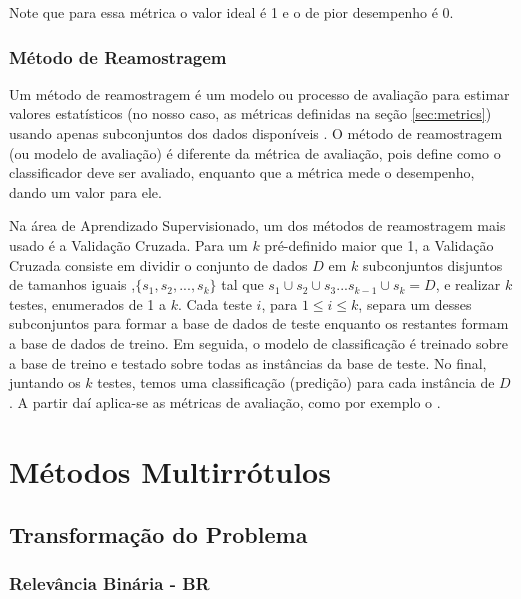 Note que para essa métrica o valor ideal é 1 e o de pior desempenho é 0.

\subsection{Método de Reamostragem}
\label{sec:modelav}

Um método de reamostragem é um modelo ou processo de avaliação para estimar valores estatísticos
(no nosso caso, as métricas definidas na seção \ref{sec:metrics}) usando apenas subconjuntos dos dados
disponíveis \cite{yu2003resampling}.
O método de reamostragem (ou modelo de avaliação) é diferente da métrica de avaliação,
pois define como o classificador deve ser avaliado, enquanto que a métrica mede o desempenho, dando um
valor para ele.

Na área de Aprendizado Supervisionado, um dos métodos de reamostragem mais usado é a Validação Cruzada.
Para um $k$ pré-definido maior que 1, a Validação Cruzada consiste
em dividir o conjunto de dados $D$
em $k$ subconjuntos disjuntos de tamanhos iguais
,$\{s_1,s_2,...,s_k\}$ tal que $s_1 \cup s_2 \cup s_3...s_{k-1}\cup s_k=D$,
e realizar $k$ testes, enumerados de 1 a $k$.
Cada teste $i$, para $1\leq i \leq k$, separa um desses subconjuntos
para formar a base de dados de teste
enquanto os restantes formam a base de dados de treino. 
Em seguida, o modelo de classificação é treinado sobre a base de treino e testado sobre todas as
instâncias da base de teste.
No final, juntando os $k$ testes, temos uma classificação (predição) para cada instância de $D$.
A partir daí aplica-se as métricas de avaliação, como por exemplo o \HL.


\chapter{Métodos Multirrótulos}
\section{Transformação do Problema}
\subsection{Relevância Binária - BR}
\label{sec:br}


